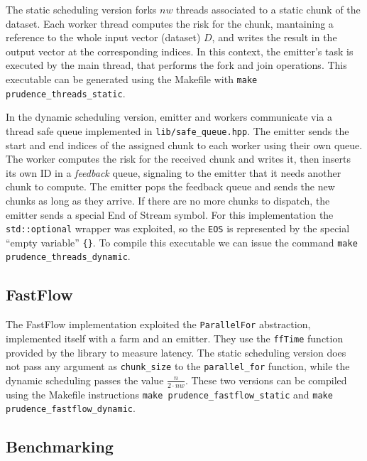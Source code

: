 \documentclass[a4paper]{article}
\begin{document}
The static scheduling version forks $nw$ threads associated to a static chunk of the dataset. Each worker thread computes the risk for the chunk, mantaining a reference to the whole input vector (dataset) $D$, and writes the result in the output vector at the corresponding indices. In this context, the emitter's task is executed by the main thread, that performs the fork and join operations. This executable can be generated using the Makefile with \texttt{make prudence\_threads\_static}.

In the dynamic scheduling version, emitter and workers communicate via a thread safe queue implemented in \texttt{lib/safe\_queue.hpp}. The emitter sends the start and end indices of the assigned chunk to each worker using their own queue. The worker computes the risk for the received chunk and writes it, then inserts its own ID in a \textit{feedback} queue, signaling to the emitter that it needs another chunk to compute. The emitter pops the feedback queue and sends the new chunks as long as they arrive. If there are no more chunks to dispatch, the emitter sends a special End of Stream symbol. For this implementation the \texttt{std::optional} wrapper was exploited, so the \texttt{EOS} is represented by the special ``empty variable'' \texttt{\{\}}. To compile this executable we can issue the command \texttt{make prudence\_threads\_dynamic}.

\subsection{FastFlow}

The FastFlow implementation exploited the \texttt{ParallelFor} abstraction, implemented itself with a farm and an emitter. They use the \texttt{ffTime} function provided by the library to measure latency. The static scheduling version does not pass any argument as \texttt{chunk\_size} to the \texttt{parallel\_for} function, while the dynamic scheduling passes the value $\frac{n}{2 \cdot nw}$. These two versions can be compiled using the Makefile instructions \texttt{make prudence\_fastflow\_static} and \texttt{make prudence\_fastflow\_dynamic}.

\subsection{Benchmarking}
\end{document}
